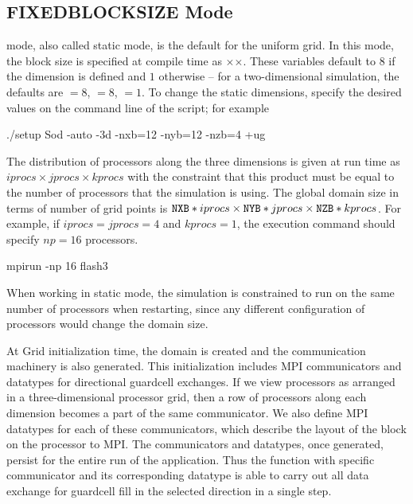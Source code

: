 \subsection{FIXEDBLOCKSIZE Mode} 
mode, also called
static mode, is the default for the uniform grid. In this mode, the
block size is specified at compile time as
$\times$$\times$. These variables
default to $8$ if the dimension is defined and $1$ otherwise -- \eg
for a two-dimensional simulation, the defaults are $=8$,
$=8$, $=1$. To change the static dimensions,
specify the desired values on the command line of the 
script; for example 
\begin{codeseg} 
./setup Sod -auto -3d -nxb=12 -nyb=12 -nzb=4 +ug
\end{codeseg} 
The distribution of processors along the three dimensions is given at 
run time as $iprocs\times jprocs\times kprocs$ with the constraint 
that this product must be equal to the number of processors that the 
simulation is using. The global domain size in terms of number of grid
points is ${\tt NXB}*iprocs \times {\tt NYB}*jprocs \times 
{\tt NZB}*kprocs$.  For example, if $iprocs=jprocs=4$ and $kprocs=1$,
the execution command should specify $np=16$ processors.
\begin{codeseg} 
mpirun -np 16 flash3 
\end{codeseg} 
When working in static mode, the simulation is constrained to run on 
the same number of processors when restarting, since any different 
configuration of processors would change the domain size. 

At Grid initialization time, the domain is created and the 
communication machinery is also generated. This initialization 
includes MPI communicators and datatypes for directional guardcell 
exchanges. If we view processors as arranged in a three-dimensional 
processor grid, then a row of processors along each dimension becomes 
a part of the same communicator. We also define MPI datatypes for each
of these communicators, which describe the layout of the block on the
processor to MPI. The communicators and datatypes, once generated, 
persist for the entire run of the application. Thus the 
 function with specific communicator and its 
corresponding datatype is able to carry out all data exchange for 
guardcell fill in the selected direction in a single step. 

